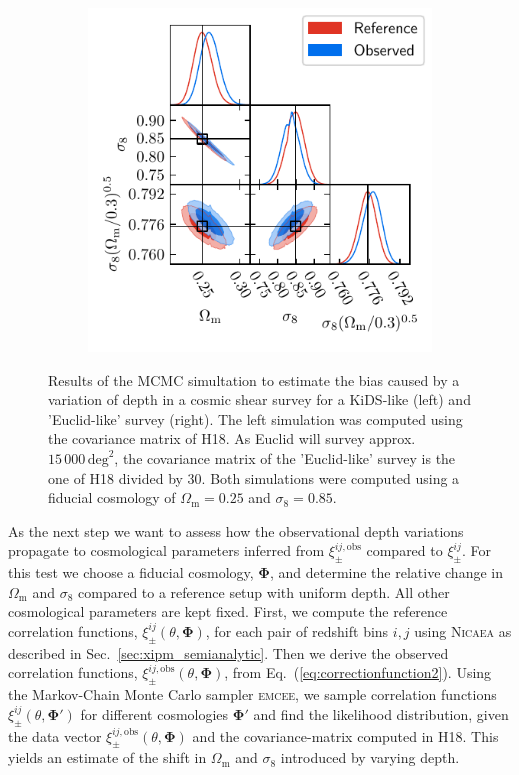 \documentclass{aa}
\renewcommand{\rm}{\mathrm}
\def\b#1{\bm{#1}}
\begin{document}
\begin{figure}
\begin{subfigure}{0.45\textwidth}
  \includegraphics[width=\textwidth]{images/mcmc_euclid.pdf}
\end{subfigure}
\caption{Results of the MCMC simultation to estimate the bias caused by a variation of depth in a cosmic shear survey for a KiDS-like (left) and 'Euclid-like' survey (right). The left simulation was computed using the covariance matrix of H18. As Euclid will survey approx. $15\,000\,\rm{deg}^2$, the covariance matrix of the 'Euclid-like' survey is the one of H18 divided by 30. Both simulations were computed using a fiducial cosmology of $\Omega_{\rm{m}}=0.25$ and $\sigma_8 = 0.85$.}
\label{fig:mcmc_results}
\end{figure} 

As the next step we want to assess how the observational depth variations propagate to cosmological parameters inferred from $\xi_\pm^{ij,\rm{obs}}$ compared to $\xi_\pm^{ij}$. For this test we choose a fiducial cosmology, $\b \Phi$, and determine the relative change in $\Omega_{\rm m}$ and $\sigma_8$ compared to a reference setup with uniform depth. All other cosmological parameters are kept fixed. First, we compute the reference correlation functions, $\xi_\pm^{ij}(\theta,\b\Phi)$, for each pair of redshift bins $i,j$ using \textsc{Nicaea} as described in Sec.~\ref{sec:xipm_semianalytic}. Then we derive the observed correlation functions, $\xi_\pm^{ij,\rm{obs}}(\theta,\b\Phi)$, from Eq.~(\ref{eq:correctionfunction2}). Using the Markov-Chain Monte Carlo sampler \textsc{emcee}, we sample correlation functions $\xi_\pm^{ij}(\theta,\b\Phi')$ for different cosmologies $\b\Phi'$ and find the likelihood distribution, given the data vector $\xi_\pm^{ij,\rm{obs}}(\theta,\b\Phi)$ and the covariance-matrix computed in H18. This yields an estimate of the shift in $\Omega_{\rm m}$ and $\sigma_8$ introduced by varying depth.
\end{document}
